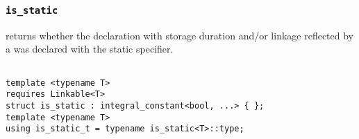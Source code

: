 
\subsubsection{\texttt{is\_static}}

returns whether the declaration with storage duration and/or linkage reflected by a  was declared with the static specifier.

\begin{verbatim}

template <typename T>
requires Linkable<T>
struct is_static : integral_constant<bool, ...> { };
template <typename T>
using is_static_t = typename is_static<T>::type;

\end{verbatim}
